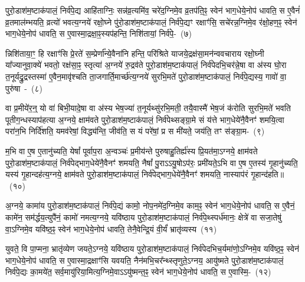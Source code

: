 पुरो॒डाश॑\-म॒ष्टा\-क॑पालं॒ निर्व॑पे॒द्य आहि॑ताग्निः॒ सन्न॑व्र॒त्यमि॑व॒ चरे॑द॒ग्निमे॒व व्र॒तप॑ति॒ꣴ॒ स्वेन॑ भाग॒\-धेये॒नोप॑ धावति॒ स ए॒वैनं॑ व्र॒तमाल॑म्भयति॒ व्रत्यो॑ भवत्य॒ग्नये॑ रक्षो॒घ्ने पु॑रो॒डाश॑म॒ष्टा\-क॑पालं॒ निर्व॑पे॒द्यꣳ रक्षाꣳ॑सि॒ सचे॑रन्न॒ग्निमे॒व र॑क्षो॒हण॒ꣴ॒ स्वेन॑ भाग॒\-धेये॒नोप॑ धावति॒ स ए॒वास्मा॒द्रक्षा॒ꣴ॒स्यप॑\-हन्ति॒ निशि॑तायां॒ निर्व॑पे॒-~(७)\ip

न्निशि॑ताया॒ꣳ॒ हि रक्षाꣳ॑सि प्रे॒रते॑ स॒म्प्रेर्णा᳚न्ये॒वैना॑नि हन्ति॒ परि॑श्रिते याजये॒द्रक्ष॑सा॒\-मन॑न्वव\-चाराय रक्षो॒घ्नी या᳚ज्यानुवा॒क्ये॑ भवतो॒ रक्ष॑सा॒ꣴ॒ स्तृत्या॑ अ॒ग्नये॑ रु॒द्रव॑ते पुरो॒डाश॑\-म॒ष्टा\-क॑पालं॒ निर्व॑पेदभि॒चर॑न्ने॒षा वा अ॑स्य घो॒रा त॒नूर्यद्रु॒द्रस्तस्मा॑ ए॒वैन॒मावृ॑श्चति ता॒जगार्ति॒मार्च्छ॑त्य॒ग्नये॑ सुरभि॒मते॑ पुरो॒डाश॑\-म॒ष्टा\-क॑पालं॒ निर्व॑पे॒द्यस्य॒ गावो॑ वा॒ पुरु॑षा~-~(८)\ip

वा प्र॒मीये॑र॒न्॒ यो वा॑ बिभी॒यादे॒षा वा अ॑स्य भेष॒ज्या॑ त॒नूर्यथ्सु॑रभि॒मती॒ तयै॒वास्मै॑ भेष॒जं क॑रोति सुरभि॒मते॑ भवति पूतीग॒न्धस्याप॑हत्या अ॒ग्नये॒ क्षाम॑वते पुरो॒डाश॑\-म॒ष्टा\-क॑पालं॒ निर्व॑पेथ्सङ्ग्रा॒मे सं य॑त्ते भाग॒\-धेये॑नै॒वैनꣳ॑ शमयि॒त्वा परा॑न॒भि निर्दि॑शति॒ यमव॑रेषां॒ विद्ध्य॑न्ति॒ जीव॑ति॒ स यं परे॑षां॒ प्र स मी॑यते॒ जय॑ति॒ तꣳ स॑ङ्ग्रा॒म-~(९)\ip

म॒भि वा ए॒ष ए॒तानु॑च्यति॒ येषां᳚ पूर्वाप॒रा अ॒न्वञ्चः॑ प्र॒मीय॑न्ते पुरुषाहु॒तिर्ह्य॑स्य प्रि॒यत॑मा॒\-ऽग्नये॒ क्षाम॑वते पुरो॒डाश॑\-म॒ष्टा\-क॑पालं॒ निर्व॑पेद्भाग॒\-धेये॑नै॒वैनꣳ॑ शमयति॒ नैषां᳚ पु॒रा\-ऽऽ\-यु॒षो\-ऽप॑रः॒ प्रमी॑यते॒\-ऽभि वा ए॒ष ए॒तस्य॑ गृ॒हानु॑च्यति॒ यस्य॑ गृ॒हान्दह॑त्य॒ग्नये॒ क्षाम॑वते पुरो॒डाश॑\-म॒ष्टा\-क॑पालं॒ निर्व॑पेद्भाग॒\-धेये॑नै॒वैनꣳ॑ शमयति॒ नास्याप॑रं गृ॒हान्द॑हति॥~(१०)\ip

{\anuvakamend[{व्र॒तप॑तये॒ निशि॑ताया॒न्निर्व॑पे॒त्पुरु॑षाः सङ्ग्रा॒मन्न च॒त्वारि॑ च}]}

अ॒ग्नये॒ कामा॑य पुरो॒डाश॑\-म॒ष्टा\-क॑पालं॒ निर्व॑पे॒द्यं कामो॒ नोप॒नमे॑द॒ग्निमे॒व काम॒ꣴ॒ स्वेन॑ भाग॒\-धेये॒नोप॑ धावति॒ स ए॒वैनं॒ कामे॑न॒ सम॑र्द्धय॒त्युपै॑नं॒ कामो॑ नमत्य॒ग्नये॒ यवि॑ष्ठाय पुरो॒डाश॑\-म॒ष्टा\-क॑पालं॒ निर्व॑पे॒थ्स्पर्ध॑मानः॒ क्षेत्रे॑ वा सजा॒तेषु॑ वा॒\-ऽग्निमे॒व यवि॑ष्ठ॒ꣴ॒ स्वेन॑ भाग॒\-धेये॒नोप॑ धावति॒ तेनै॒वेन्द्रि॒यं वी॒र्यं॑ भ्रातृ॑व्यस्य~(११)\ip

युवते॒ वि पा॒प्मना॒ भ्रातृ॑व्येण जयते॒\-ऽग्नये॒ यवि॑ष्ठाय पुरो॒डाश॑\-म॒ष्टा\-क॑पालं॒ निर्व॑पेदभिच॒र्यमा॑णो॒\-ऽग्निमे॒व यवि॑ष्ठ॒ꣴ॒ स्वेन॑ भाग॒\-धेये॒नोप॑ धावति॒ स ए॒वास्मा॒द्रक्षाꣳ॑सि यवयति॒ नैन॑मभि॒चर᳚न्थ्स्तृणुते॒\-ऽग्नय॒ आयु॑ष्मते पुरो॒डाश॑\-म॒ष्टा\-क॑पालं॒ निर्व॑पे॒द्यः का॒मये॑त॒ सर्व॒मायु॑रिया॒मित्य॒ग्निमे॒वा\-ऽऽ\-यु॑ष्मन्त॒ꣴ॒ स्वेन॑ भाग॒\-धेये॒नोप॑ धावति॒ स ए॒वास्मि॒-~(१२)\ip

